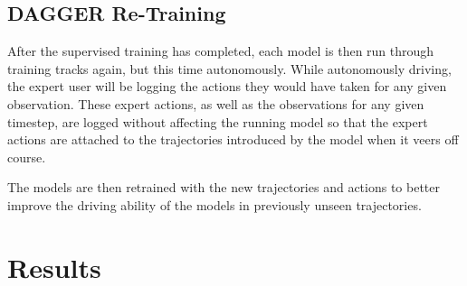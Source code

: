 \documentclass[conference]{IEEEtran}
\begin{document}
\subsection{DAGGER Re-Training}
After the supervised training has completed, each model is then run through training tracks again, but this
time autonomously. While autonomously driving, the expert user will be logging the actions they would 
have taken for any given observation. These expert actions, as well as the observations for any given 
timestep, are logged without affecting the running model so that the expert actions are attached to the 
trajectories introduced by the model when it veers off course. \par 
The models are then retrained with the new trajectories and actions to better improve the driving 
ability of the models in previously unseen trajectories.

\section{Results}
\end{document}
